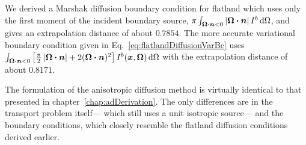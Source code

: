 We derived a Marshak diffusion boundary condition for flatland which uses only
the first moment of the incident boundary source, $\pi
\int_{\bm{\Omega}\bm{\cdot} \bm{n} < 0 } \left| \bm{\Omega}\bm{\cdot} \bm{n} \right| I^b
\mathop{}\!\mathrm{d}\Omega$, and gives an extrapolation distance of about $0.7854$.
The more accurate variational boundary condition given in
Eq.~\eqref{eq:flatlandDiffusionVarBc} uses $\int_{\bm{\Omega}\bm{\cdot}\bm{n} < 0}
\left[ \frac{\pi}{2} \left| \bm{\Omega}\bm{\cdot}\bm{n} \right| + 2 (\bm{\Omega}\bm{\cdot}\bm{n})^2
\right] I^b(\bm{x}, \bm{\Omega}) \mathop{}\!\mathrm{d}\Omega$ with the extrapolation
distance of about $0.8171$.

The formulation of the anisotropic diffusion method is virtually identical to
that presented in chapter~\ref{chap:adDerivation}. The only differences are in
the transport problem itself---%
which still uses a unit isotropic source---%
and the boundary conditions, which closely resemble the flatland diffusion
conditions derived earlier.

